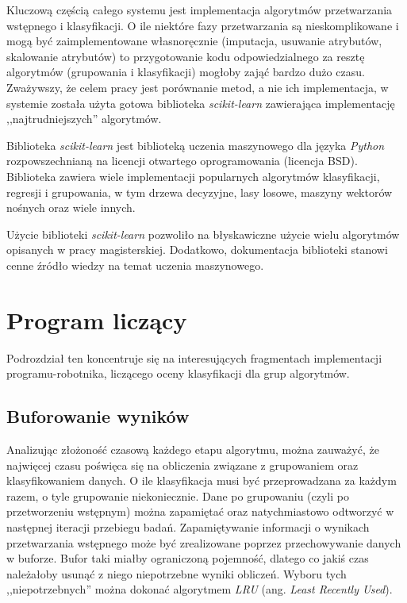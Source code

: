 \documentclass[../thesis.tex]{subfiles}
\begin{document}
Kluczową częścią całego systemu jest implementacja algorytmów przetwarzania wstępnego i klasyfikacji. O ile niektóre fazy przetwarzania są nieskomplikowane i mogą być zaimplementowane własnoręcznie (imputacja, usuwanie atrybutów, skalowanie atrybutów) to przygotowanie kodu odpowiedzialnego za resztę algorytmów (grupowania i klasyfikacji) mogłoby zająć bardzo dużo czasu. Zważywszy, że celem pracy jest porównanie metod, a nie ich implementacja, w systemie została użyta gotowa biblioteka \emph{scikit-learn} zawierająca implementację ,,najtrudniejszych'' algorytmów.

Biblioteka \emph{scikit-learn} jest biblioteką uczenia maszynowego dla języka \emph{Python} rozpowszechnianą na licencji otwartego oprogramowania (licencja BSD). Biblioteka zawiera wiele implementacji popularnych algorytmów klasyfikacji, regresji i grupowania, w tym drzewa decyzyjne, lasy losowe, maszyny wektorów nośnych oraz wiele innych.

Użycie biblioteki \emph{scikit-learn} pozwoliło na błyskawiczne użycie wielu algorytmów opisanych w pracy magisterskiej. Dodatkowo, dokumentacja biblioteki stanowi cenne źródło wiedzy na temat uczenia maszynowego.

\section{Program liczący}

Podrozdział ten koncentruje się na interesujących fragmentach implementacji programu-robotnika, liczącego oceny klasyfikacji dla grup algorytmów.

\subsection{Buforowanie wyników}
\label{impl:opt}

Analizując złożoność czasową każdego etapu algorytmu, można zauważyć, że najwięcej czasu poświęca się na obliczenia związane z grupowaniem oraz klasyfikowaniem danych. O ile klasyfikacja musi być przeprowadzana za każdym razem, o tyle grupowanie niekoniecznie. Dane po grupowaniu (czyli po przetworzeniu wstępnym) można zapamiętać oraz natychmiastowo odtworzyć w następnej iteracji przebiegu badań. Zapamiętywanie informacji o wynikach przetwarzania wstępnego może być zrealizowane poprzez przechowywanie danych w buforze. Bufor taki miałby ograniczoną pojemność, dlatego co jakiś czas należałoby usunąć z niego niepotrzebne wyniki obliczeń. Wyboru tych ,,niepotrzebnych'' można dokonać algorytmem \emph{LRU} (ang. \emph{Least Recently Used}).
\end{document}
